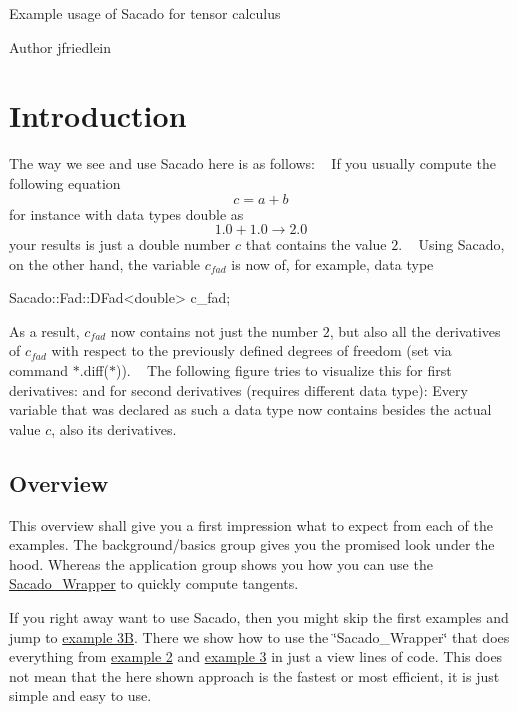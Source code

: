 Example usage of Sacado for tensor calculus\begin{DoxyAuthor}{Author}
jfriedlein
\end{DoxyAuthor}
\hypertarget{index_intro}{}\section{Introduction}\label{index_intro}
The way we see and use Sacado here is as follows\+: ~\newline
If you usually compute the following equation ~\newline
 \[ c = a + b \] for instance with data types double as ~\newline
 \[ 1.0 + 1.0 \rightarrow 2.0 \] your results is just a double number $ c $ that contains the value $ 2 $. ~\newline
 Using Sacado, on the other hand, the variable $ c_{fad} $ is now of, for example, data type 
\begin{DoxyCode}
Sacado::Fad::DFad<double> c\_fad;
\end{DoxyCode}
 As a result, $ c_{fad} $ now contains not just the number $ 2 $, but also all the derivatives of $ c_{fad} $ with respect to the previously defined degrees of freedom (set via command $\ast$.diff($\ast$)). ~\newline
The following figure tries to visualize this for first derivatives\+:  and for second derivatives (requires different data type)\+:  Every variable that was declared as such a data type now contains besides the actual value $ c $, also its derivatives.\hypertarget{index_subsec_overview}{}\subsection{Overview}\label{index_subsec_overview}
This overview shall give you a first impression what to expect from each of the examples. The background/basics group gives you the promised look under the hood. Whereas the application group shows you how you can use the \hyperlink{namespaceSacado__Wrapper}{Sacado\+\_\+\+Wrapper} to quickly compute tangents. 

If you right away want to use Sacado, then you might skip the first examples and jump to \hyperlink{index_Ex3B}{example 3B}. There we show how to use the \char`\"{}\+Sacado\+\_\+\+Wrapper\char`\"{} that does everything from \hyperlink{index_Ex2}{example 2} and \hyperlink{index_Ex3}{example 3} in just a view lines of code. This does not mean that the here shown approach is the fastest or most efficient, it is just simple and easy to use.

